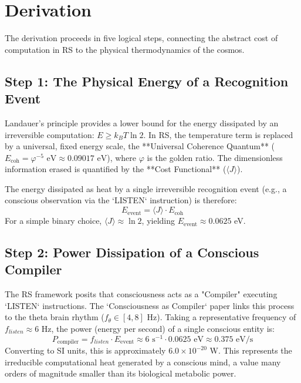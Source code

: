 \documentclass[12pt]{article}
\begin{document}
\section{Derivation}

The derivation proceeds in five logical steps, connecting the abstract cost of computation in RS to the physical thermodynamics of the cosmos.

\subsection{Step 1: The Physical Energy of a Recognition Event}

Landauer's principle provides a lower bound for the energy dissipated by an irreversible computation: \(E \geq k_B T \ln 2\). In RS, the temperature term is replaced by a universal, fixed energy scale, the **Universal Coherence Quantum** (\(E_{\text{coh}} = \varphi^{-5} \text{ eV} \approx 0.09017 \text{ eV}\)), where \(\varphi\) is the golden ratio. The dimensionless information erased is quantified by the **Cost Functional** (\(\langle J \rangle\)).

The energy dissipated as heat by a single irreversible recognition event (e.g., a conscious observation via the `LISTEN` instruction) is therefore:
\begin{equation}
    E_{\text{event}} = \langle J \rangle \cdot E_{\text{coh}}
\end{equation}
For a simple binary choice, \(\langle J \rangle \approx \ln 2\), yielding \(E_{\text{event}} \approx 0.0625\) eV.

\subsection{Step 2: Power Dissipation of a Conscious Compiler}

The RS framework posits that consciousness acts as a "Compiler" executing `LISTEN` instructions. The `Consciousness as Compiler` paper links this process to the theta brain rhythm (\(f_{\theta} \in [4, 8]\) Hz). Taking a representative frequency of \(f_{listen} \approx 6\) Hz, the power (energy per second) of a single conscious entity is:
\begin{equation}
    P_{\text{compiler}} = f_{listen} \cdot E_{\text{event}} \approx 6 \text{ s}^{-1} \cdot 0.0625 \text{ eV} \approx 0.375 \text{ eV/s}
\end{equation}
Converting to SI units, this is approximately \(6.0 \times 10^{-20}\) W. This represents the irreducible computational heat generated by a conscious mind, a value many orders of magnitude smaller than its biological metabolic power.
\end{document}
